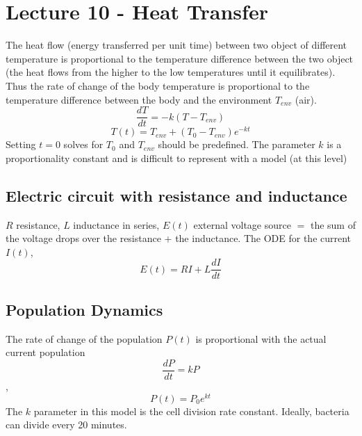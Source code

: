 \documentclass[a6paper]{article}
\theoremstyle{definition}
\theoremstyle{plain}
\theoremstyle{remark}
\begin{document}

\section{Lecture 10 - Heat Transfer}
The heat flow (energy transferred per unit time) between two object of
different temperature is proportional to the temperature difference between the
two object (the heat flows from the higher to the low temperatures until it
equilibrates). Thus the rate of change of the body temperature is proportional
to the temperature difference between the body and the environment $ T_{env}
$ (air). 
$$ \frac{dT}{dt} = - k(T-T_{env})  $$
$$ T(t) = T_{env} + (T_0 - T_{env})e^{-kt} $$
Setting $ t = 0 $ solves for $ T_0 $ and $ T_{env} $ should be predefined. The
parameter $ k $ is a proportionality constant and is difficult to represent
with a model (at this level)
\subsection{Electric circuit with resistance and inductance}
$ R $ resistance, $ L $ inductance in series, $ E(t) $ external voltage source
$ = $ the sum of the voltage drops over the resistance + the inductance.
The ODE for the current $ I(t) $,
$$ E(t) = RI + L \frac{dI}{dt} $$
\subsection{Population Dynamics}
The rate of change of the population $ P(t) $ is proportional with the actual
current population 
$$ \frac{dP}{dt} = kP $$, $$ P(t) = P_0 e^{kt} $$
The $ k $ parameter in this model is the cell division rate constant. Ideally,
bacteria can divide every 20 minutes.
\end{document}

